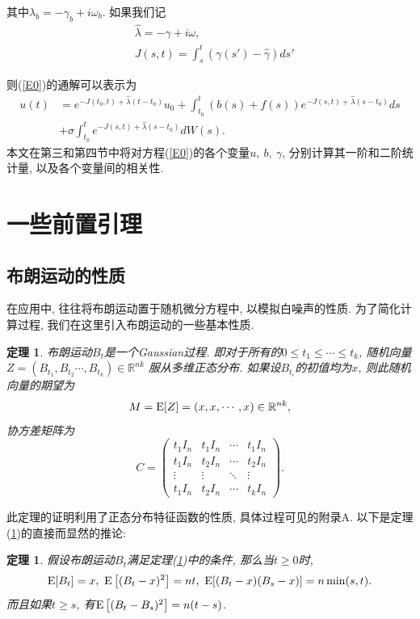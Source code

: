 \documentclass[notitlepage,cs4size,punct,oneside]{ctexrep}
\numberwithin{equation}{section}
\theoremstyle{mystyle}
\newtheorem{theorem}[definition]{\hspace{2em}定理}
\begin{document}
其中$\lambda_b = -\gamma_b+i\omega_b$.
如果我们记
\begin{equation} \label{def J(s, t)}
\begin{split}
&\hat{\lambda} = -\hat{\gamma}+i\omega, \\[5pt]
&J(s, t) = \int_s^t (\gamma(s')-\hat{\gamma})ds'
\end{split}
\end{equation}

则(\ref{E0})的通解可以表示为
\begin{equation} \label{Su}
\begin{split}
u(t) &= e^{-J(t_0, t)+\hat{\lambda}(t-t_0)}u_0 + \int_{t_0}^t (b(s)+f(s))e^{-J(s, t)+\hat{\lambda}(s-t_0)}ds \\[5pt]
& + \sigma\int_{t_0}^{t}e^{-J(s, t)+\hat{\lambda}(s-t_0)}dW(s).
\end{split}
\end{equation}
本文在第三和第四节中将对方程(\ref{E0})的各个变量$u, ~b, ~\gamma$, 分别计算其一阶和二阶统计量, 以及各个变量间的相关性.

\section{一些前置引理}
\subsection{布朗运动的性质}
在应用中, 往往将布朗运动置于随机微分方程中, 以模拟白噪声的性质\cite{hida1980brownian}. 
为了简化计算过程, 我们在这里引入布朗运动的一些基本性质\cite{oksendal2003stochastic}\cite{nelson1967dynamical}.
\begin{theorem} \label{brownian1}
布朗运动$B_t$是一个Gaussian过程. 即对于所有的$0 \leqslant t_1 \leqslant\cdots\leqslant t_k$, 随机向量$Z = (B_{t_1}, B_{t_2}\cdots ,B_{t_k})\in \mathbb{R}^{nk}$ 服从多维正态分布. 如果设$B_{t_i}$的初值均为$x$, 则此随机向量的期望为 
$$M = \text{E}[Z] = (x, x, \cdots, x) \in \mathbb{R}^{nk},$$
协方差矩阵为
$$C = \left(\begin{matrix}
			t_1I_n & t_1I_n & \cdots & t_1I_n \\
			t_1I_n & t_2I_n & \cdots & t_2I_n \\
			\vdots & \vdots & \ddots & \vdots \\
			t_1I_n & t_2I_n & \cdots & t_kI_n 
			\end{matrix}
			\right).$$
\end{theorem}

此定理的证明利用了正态分布特征函数的性质, 具体过程可见\cite{oksendal2003stochastic}的附录A. 以下是定理(\ref{brownian1})的直接而显然的推论:
\begin{theorem}
假设布朗运动$B_t$满足定理(\ref{brownian1})中的条件, 那么当$t\geqslant 0$时,
$$\text{E}[B_t] = x, ~\text{E}\left[(B_t - x)^2\right] = nt, ~\text{E}[(B_t - x)(B_s - x)] = n\min(s, t).$$ 
而且如果$t \geqslant s$, 有$\text{E}\left[(B_t - B_s)^2\right] = n(t-s)$.
\end{theorem}
\end{document}
